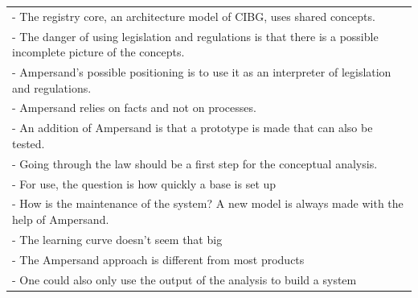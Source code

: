 \begin{xltabular}{\textwidth}{|X|}
-	The registry core, an architecture model of CIBG, uses shared concepts.	\\
-	The danger of using legislation and regulations is that there is a possible incomplete picture of the concepts.	\\
-	Ampersand's possible positioning is to use it as an interpreter of legislation and regulations. 	\\
-	Ampersand relies on facts and not on processes.	\\
-	An addition of Ampersand is that a prototype is made that can also be tested. 	\\
-	Going through the law should be a first step for the conceptual analysis.	\\
-	For use, the question is how quickly a base is set up	\\
-	How is the maintenance of the system? A new model is always made with the help of Ampersand.	\\
-	The learning curve doesn't seem that big	\\
-	The Ampersand approach is different from most products	\\
-	One could also only use the output of the analysis to build a system	\\
\end{xltabular}


